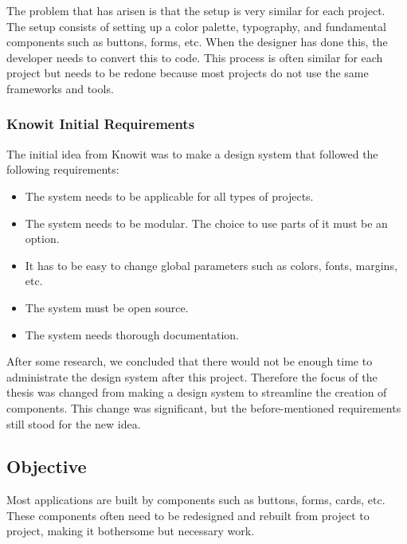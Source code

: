 The problem that has arisen is that the setup is very similar for each project. The setup consists of setting up a color palette, typography, and fundamental components such as buttons, forms, etc. When the designer has done this, the developer needs to convert this to code. This process is often similar for each project but needs to be redone because most projects do not use the same frameworks and tools. 

\subsubsection{Knowit Initial Requirements}%
\label{ssub:Knowit Initial Requirements}
The initial idea from Knowit was to make a design system\cite{fanguyComprehensiveGuideDesign} that followed the following requirements:
\begin{itemize}
  \item The system needs to be applicable for all types of projects.
  \item The system needs to be modular. The choice to use parts of it must be an option.
  \item It has to be easy to change global parameters such as colors, fonts, margins, etc.
  \item The system must be open source.
  \item The system needs thorough documentation.
\end{itemize}

After some research, we concluded that there would not be enough time to administrate the design system after this project. Therefore the focus of the thesis was changed from making a design system to streamline the creation of components. This change was significant, but the before-mentioned requirements still stood for the new idea. 




\subsection{Objective}
\label{sub:Objective}
Most applications are built by components such as buttons, forms, cards\cite{babichSimpleDesignTips2020}, etc. These components often need to be redesigned and rebuilt from project to project, making it bothersome but necessary work. 

